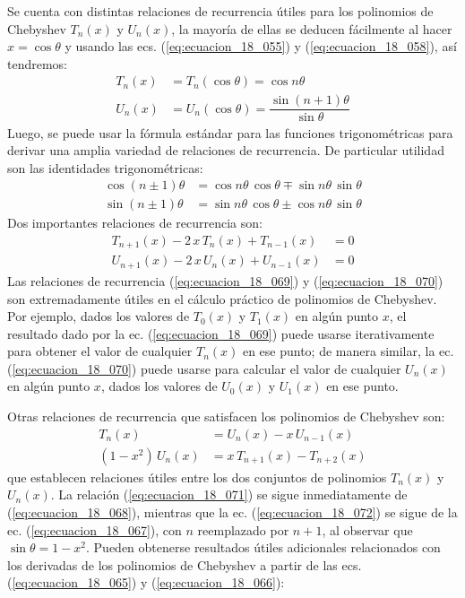 Se cuenta con distintas relaciones de recurrencia útiles para los polinomios de Chebyshev $T_{n}(x)$ y $U_{n}(x)$, la mayoría de ellas se deducen fácilmente al hacer $x = \cos \theta$ y usando las ecs. (\ref{eq:ecuacion_18_055}) y (\ref{eq:ecuacion_18_058}), así tendremos:
\begin{align}
T_{n} (x) &= T_{n} (\cos \theta) = \cos n \theta \label{eq:ecuacion_18_065} \\[0.5em]
U_{n} (x) &= U_{n} (\cos \theta) = \dfrac{\sin (n + 1) \theta}{\sin \theta} \label{eq:ecuacion_18_066} 
\end{align}
Luego, se puede usar la fórmula estándar para las funciones trigonométricas para derivar una amplia variedad de relaciones de recurrencia. De particular utilidad son las identidades trigonométricas:
\begin{align}
\cos (n \pm 1)\theta &= \cos n \theta \, \cos \theta \mp \sin n \theta \, \sin \theta \label{eq:ecuacion_18_067} \\[0.5em]
\sin (n \pm 1)\theta &= \sin n \theta \, \cos \theta \pm \cos n \theta \, \sin \theta \label{eq:ecuacion_18_068}
\end{align}
Dos importantes relaciones de recurrencia son:
\begin{align}
T_{n+1} (x) - 2 \, x \, T_{n} (x) + T_{n-1} (x) &= 0 \label{eq:ecuacion_18_069} \\[0.5em]
U_{n+1} (x) - 2 \, x \, U_{n} (x) + U_{n-1} (x) &= 0 \label{eq:ecuacion_18_070}
\end{align}
Las relaciones de recurrencia (\ref{eq:ecuacion_18_069}) y (\ref{eq:ecuacion_18_070}) son extremadamente útiles en el cálculo práctico de polinomios de Chebyshev. Por ejemplo, dados los valores de $T_{0} (x)$ y $T_{1} (x)$ en algún punto $x$, el resultado dado por la ec. (\ref{eq:ecuacion_18_069}) puede usarse iterativamente para obtener el valor de cualquier $T_{n} (x)$ en ese punto; de manera similar, la ec. (\ref{eq:ecuacion_18_070}) puede usarse para calcular el valor de cualquier $U_{n} (x)$ en algún punto $x$, dados los valores de $U_{0} (x)$ y $U_{1} (x)$ en ese punto.
\par
Otras relaciones de recurrencia que satisfacen los polinomios de Chebyshev son:
\begin{align}
T_{n} (x) &= U_{n}(x) - x \, U_{n-1} (x) \label{eq:ecuacion_18_071} \\[0.5em]
(1 - x^{2}) \, U_{n} (x) &= x \, T_{n+1} (x) - T_{n+2} (x) \label{eq:ecuacion_18_072}
\end{align}
que establecen relaciones útiles entre los dos conjuntos de polinomios $T_{n} (x)$ y $U_{n} (x)$. La relación (\ref{eq:ecuacion_18_071}) se sigue inmediatamente de (\ref{eq:ecuacion_18_068}), mientras que la ec. (\ref{eq:ecuacion_18_072}) se sigue de la ec. (\ref{eq:ecuacion_18_067}), con $n$ reemplazado por $n + 1$, al observar que $\sin \theta = 1 - x^{2}$. Pueden obtenerse resultados útiles adicionales relacionados con los derivadas de los polinomios de Chebyshev a partir de las ecs. (\ref{eq:ecuacion_18_065}) y (\ref{eq:ecuacion_18_066}):
